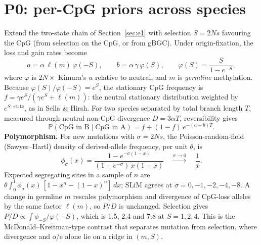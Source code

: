 \documentclass[11pt]{article}
\theoremstyle{definition}
\renewcommand{\Pr}{\mathbb{P}}
\begin{document}
\section{P0: per-CpG priors across species}\label{sec:p0}
Extend the two-state chain of Section~\ref{sec:e1} with selection $S=2Ns$ favouring the CpG (from selection on
the CpG, or from gBGC). Under origin-fixation, the loss and gain rates become
\begin{equation}
a=\alpha\,\ell(m)\,\varphi(-S),\qquad b=\alpha\,\gamma\,\varphi(S),\qquad \varphi(S)=\frac{S}{1-e^{-S}},
\end{equation}
where $\varphi$ is $2N\times$ Kimura's $u$ relative to neutral, and $m$ is \emph{germline} methylation. Because
$\varphi(S)/\varphi(-S)=e^{S}$, the stationary CpG frequency is $f=\gamma e^{S}/(\gamma e^{S}+\ell(m))$: the neutral
stationary distribution weighted by $e^{S\cdot\text{state}}$, as in Sella \& Hirsh. For two species separated by
total branch length $T$, measured through neutral non-CpG divergence $D=3\alpha T$, reversibility gives
\begin{equation}
\Pr(\text{CpG in B}\mid\text{CpG in A})=f+(1-f)\,e^{-(a+b)T}.
\end{equation}
\textbf{Polymorphism.} For new mutations with $\sigma=2Ns$, the Poisson-random-field (Sawyer--Hartl) density of
derived-allele frequency, per unit $\theta$, is
\begin{equation}
\phi_\sigma(x)=\frac{1-e^{-\sigma(1-x)}}{(1-e^{-\sigma})\,x(1-x)}\quad\xrightarrow{\sigma\to0}\quad\frac1x .
\end{equation}
Expected segregating sites in a sample of $n$ are $\theta\int_0^1\phi_\sigma(x)\,[1-x^n-(1-x)^n]\,dx$; SLiM agrees
at $\sigma=0,-1,-2,-4,-8$. A change in germline $m$ rescales polymorphism and divergence of CpG-loss alleles by the
same factor $\ell(m)$, so $P/D$ is unchanged. Selection gives
$P/D \propto \int\phi_{-S}/\varphi(-S)$, which is 1.5, 2.4 and 7.8 at $S=1,2,4$. This is the McDonald--Kreitman-type
contrast that separates mutation from selection, where divergence and o/e alone lie on a ridge in $(m,S)$.
\end{document}
